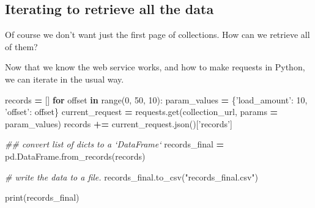 \documentclass[]{book}
\newenvironment{Shaded}{\begin{snugshade}}{\end{snugshade}}
\newcommand{\BuiltInTok}[1]{#1}
\newcommand{\CommentTok}[1]{\textcolor[rgb]{0.56,0.35,0.01}{\textit{#1}}}
\newcommand{\ControlFlowTok}[1]{\textcolor[rgb]{0.13,0.29,0.53}{\textbf{#1}}}
\newcommand{\DecValTok}[1]{\textcolor[rgb]{0.00,0.00,0.81}{#1}}
\newcommand{\KeywordTok}[1]{\textcolor[rgb]{0.13,0.29,0.53}{\textbf{#1}}}
\newcommand{\NormalTok}[1]{#1}
\newcommand{\OperatorTok}[1]{\textcolor[rgb]{0.81,0.36,0.00}{\textbf{#1}}}
\newcommand{\StringTok}[1]{\textcolor[rgb]{0.31,0.60,0.02}{#1}}
\begin{document}
\hypertarget{iterating-to-retrieve-all-the-data}{%
\subsection{Iterating to retrieve all the data}\label{iterating-to-retrieve-all-the-data}}

Of course we don't want just the first page of collections. How can we
retrieve all of them?

Now that we know the web service works, and how to make requests in
Python, we can iterate in the usual way.

\begin{Shaded}
\begin{Highlighting}[]
\NormalTok{records }\OperatorTok{=}\NormalTok{ []}
\ControlFlowTok{for}\NormalTok{ offset }\KeywordTok{in} \BuiltInTok{range}\NormalTok{(}\DecValTok{0}\NormalTok{, }\DecValTok{50}\NormalTok{, }\DecValTok{10}\NormalTok{):}
\NormalTok{    param_values }\OperatorTok{=}\NormalTok{ \{}\StringTok{'load_amount'}\NormalTok{: }\DecValTok{10}\NormalTok{, }\StringTok{'offset'}\NormalTok{: offset\}}
\NormalTok{    current_request }\OperatorTok{=}\NormalTok{ requests.get(collection_url, params }\OperatorTok{=}\NormalTok{ param_values)}
\NormalTok{    records }\OperatorTok{+=}\NormalTok{ current_request.json()[}\StringTok{'records'}\NormalTok{]}
\end{Highlighting}
\end{Shaded}

\begin{Shaded}
\begin{Highlighting}[]
\CommentTok{## convert list of dicts to a `DataFrame`}
\NormalTok{records_final }\OperatorTok{=}\NormalTok{ pd.DataFrame.from_records(records)}
\end{Highlighting}
\end{Shaded}

\begin{Shaded}
\begin{Highlighting}[]
\CommentTok{# write the data to a file.}
\NormalTok{records_final.to_csv(}\StringTok{"records_final.csv"}\NormalTok{)}
\end{Highlighting}
\end{Shaded}

\begin{Shaded}
\begin{Highlighting}[]
\BuiltInTok{print}\NormalTok{(records_final)}
\end{Highlighting}
\end{Shaded}
\end{document}
